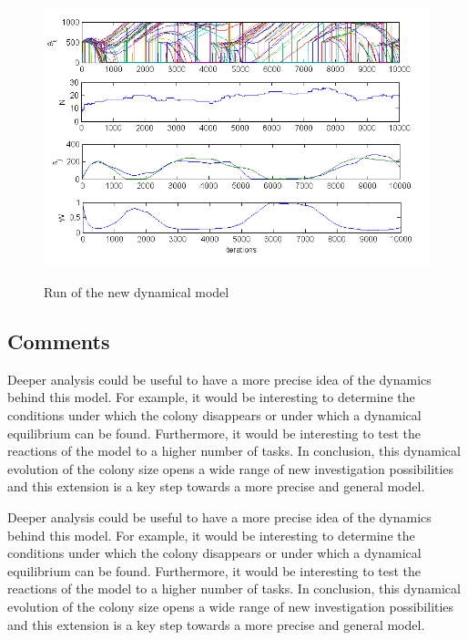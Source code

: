 \begin{figure}[ht!]
\begin{centering}
\includegraphics[scale=0.8]{figures/Figure6}
\label{fig:figure8}
\par\end{centering}

\begin{centering}
\caption{Run of the new dynamical model}

\par\end{centering}

\end{figure}




\subsection{Comments}

Deeper analysis could be useful to have a more precise idea of the
dynamics behind this model. For example, it would be interesting to
determine the conditions under which the colony disappears or under
which a dynamical equilibrium can be found. Furthermore, it would
be interesting to test the reactions of the model to a higher number
of tasks. In conclusion, this dynamical evolution of the colony size
opens a wide range of new investigation possibilities and this extension
is a key step towards a more precise and general model.


Deeper analysis could be useful to have a more precise idea of the
dynamics behind this model. For example, it would be interesting to
determine the conditions under which the colony disappears or under
which a dynamical equilibrium can be found. Furthermore, it would
be interesting to test the reactions of the model to a higher number
of tasks. In conclusion, this dynamical evolution of the colony size
opens a wide range of new investigation possibilities and this extension
is a key step towards a more precise and general model.
%


